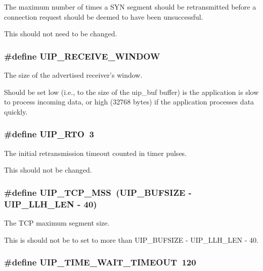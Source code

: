 The maximum number of times a SYN segment should be retransmitted before a connection request should be deemed to have been unsuccessful. 

This should not need to be changed. \hypertarget{a00074_g5b9dba2123705bce1ce95c3deca0bdad}{
\subsubsection[UIP\_\-RECEIVE\_\-WINDOW]{\setlength{\rightskip}{0pt plus 5cm}\#define UIP\_\-RECEIVE\_\-WINDOW}}
\label{a00074_g5b9dba2123705bce1ce95c3deca0bdad}


The size of the advertised receiver's window. 

Should be set low (i.e., to the size of the uip\_\-buf buffer) is the application is slow to process incoming data, or high (32768 bytes) if the application processes data quickly. \hypertarget{a00074_g15de27b044603284f68db05a378235a7}{
\subsubsection[UIP\_\-RTO]{\setlength{\rightskip}{0pt plus 5cm}\#define UIP\_\-RTO~3}}
\label{a00074_g15de27b044603284f68db05a378235a7}


The initial retransmission timeout counted in timer pulses. 

This should not be changed. \hypertarget{a00074_g4910467b83a639f06739c82cd362037e}{
\subsubsection[UIP\_\-TCP\_\-MSS]{\setlength{\rightskip}{0pt plus 5cm}\#define UIP\_\-TCP\_\-MSS~(UIP\_\-BUFSIZE - UIP\_\-LLH\_\-LEN - 40)}}
\label{a00074_g4910467b83a639f06739c82cd362037e}


The TCP maximum segment size. 

This is should not be to set to more than UIP\_\-BUFSIZE - UIP\_\-LLH\_\-LEN - 40. \hypertarget{a00074_g2bc3b489923793759526a3181eb667fa}{
\subsubsection[UIP\_\-TIME\_\-WAIT\_\-TIMEOUT]{\setlength{\rightskip}{0pt plus 5cm}\#define UIP\_\-TIME\_\-WAIT\_\-TIMEOUT~120}}
\label{a00074_g2bc3b489923793759526a3181eb667fa}


